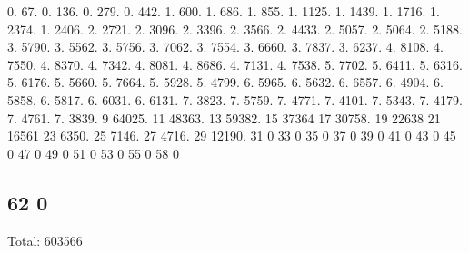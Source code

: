 0. 67. 0. 136. 0. 279. 0. 442. 1. 600. 1. 686. 1. 855. 1. 1125. 1. 1439. 1. 1716. 1. 2374. 1. 2406. 2. 2721. 2. 3096. 2. 3396. 2. 3566. 2. 4433. 2. 5057. 2. 5064. 2. 5188. 3. 5790. 3. 5562. 3. 5756. 3. 7062. 3. 7554. 3. 6660. 3. 7837. 3. 6237. 4. 8108. 4. 7550. 4. 8370. 4. 7342. 4. 8081. 4. 8686. 4. 7131. 4. 7538. 5. 7702. 5. 6411. 5. 6316. 5. 6176. 5. 5660. 5. 7664. 5. 5928. 5. 4799. 6. 5965. 6. 5632. 6. 6557. 6. 4904. 6. 5858. 6. 5817. 6. 6031. 6. 6131. 7. 3823. 7. 5759. 7. 4771. 7. 4101. 7. 5343. 7. 4179. 7. 4761. 7. 3839. 9 64025. 11 48363. 13 59382. 15 37364 17 30758. 19 22638 21 16561 23 6350. 25 7146. 27 4716. 29 12190. 31 0 33 0 35 0 37 0 39 0 41 0 43 0 45 0 47 0 49 0 51 0 53 0 55 0 58 0 \subsection*{62 0 }

Total\+: 603566 